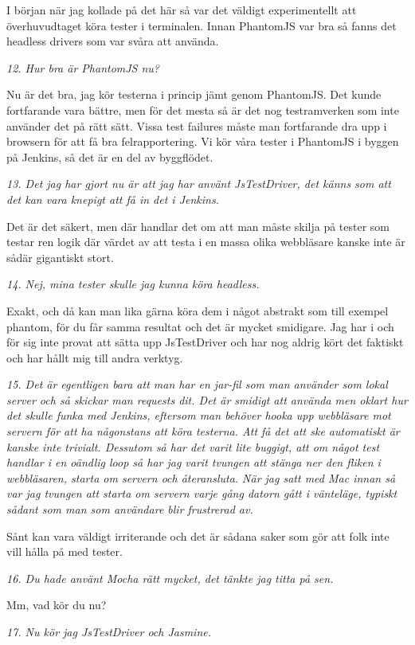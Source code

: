 \documentclass[11pt]{article}
\begin{document}
I början när jag kollade på det här så var det väldigt experimentellt att överhuvudtaget köra tester i terminalen. Innan PhantomJS var bra så fanns det headless drivers som var svåra att använda.

\emph{12. Hur bra är PhantomJS nu?}

Nu är det bra, jag kör testerna i princip jämt genom PhantomJS. Det kunde fortfarande vara bättre, men för det mesta så är det nog testramverken som inte använder det på rätt sätt. Vissa test failures måste man fortfarande dra upp i browsern för att få bra felrapportering. Vi kör våra tester i PhantomJS i byggen på Jenkins, så det är en del av byggflödet.

\emph{13. Det jag har gjort nu är att jag har använt JsTestDriver, det känns som att det kan vara knepigt att få in det i Jenkins.}

Det är det säkert, men där handlar det om att man måste skilja på tester som testar ren logik där värdet av att testa i en massa olika webbläsare kanske inte är sådär gigantiskt stort.

\emph{14. Nej, mina tester skulle jag kunna köra headless.}

Exakt, och då kan man lika gärna köra dem i något abstrakt som till exempel phantom, för du får samma resultat och det är mycket smidigare. Jag har i och för sig inte provat att sätta upp JsTestDriver och har nog aldrig kört det faktiskt och har hållt mig till andra verktyg.

\emph{15. Det är egentligen bara att man har en jar-fil som man använder som lokal server och så skickar man requests dit. Det är smidigt att använda men oklart hur det skulle funka med Jenkins, eftersom man behöver hooka upp webbläsare mot servern för att ha någonstans att köra testerna. Att få det att ske automatiskt är kanske inte trivialt. Dessutom så har det varit lite buggigt, att om något test handlar i en oändlig loop så har jag varit tvungen att stänga ner den fliken i webbläsaren, starta om servern och återansluta. När jag satt med Mac innan så var jag tvungen att starta om servern varje gång datorn gått i vänteläge, typiskt sådant som man som användare blir frustrerad av.}

Sånt kan vara väldigt irriterande och det är sådana saker som gör att folk inte vill hålla på med tester.

\emph{16. Du hade använt Mocha rätt mycket, det tänkte jag titta på sen.}

Mm, vad kör du nu?

\emph{17. Nu kör jag JsTestDriver och Jasmine.}
\end{document}
